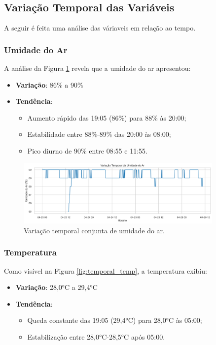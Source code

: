 \documentclass[12pt, a4paper]{article}
\begin{document}
\subsection{Variação Temporal das Variáveis}
A seguir é feita uma análise das váriaveis em relação ao tempo. 

\subsubsection{Umidade do Ar}
A análise da Figura \ref{fig:temporal_umidadear} revela que a umidade do ar apresentou:
\begin{itemize}
    \item \textbf{Variação}: 86\% a 90\%
    \item \textbf{Tendência}:
    \begin{itemize}
        \item Aumento rápido das 19:05 (86\%) para 88\% às 20:00;
        \item Estabilidade entre 88\%-89\% das 20:00 às 08:00;
        \item Pico diurno de 90\% entre 08:55 e 11:55.
    \end{itemize}
\end{itemize}

\begin{figure}[H]
\centering
\includegraphics[width=0.9\textwidth]{graficos/temporal_umidadear.png}
\caption{Variação temporal conjunta de umidade do ar.}
\label{fig:temporal_umidadear}
\end{figure}

\subsubsection{Temperatura}
Como visível na Figura \ref{fig:temporal_temp}, a temperatura exibiu:
\begin{itemize}
    \item \textbf{Variação}: 28,0°C a 29,4°C
    \item \textbf{Tendência}:
    \begin{itemize}
        \item Queda constante das 19:05 (29,4°C) para 28,0°C às 05:00;
        \item Estabilização entre 28,0°C-28,5°C após 05:00.
    \end{itemize}
\end{itemize}
\end{document}
